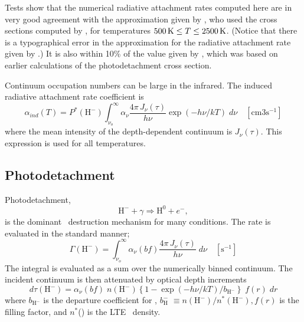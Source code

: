 Tests show that the numerical radiative attachment rates computed here
are in very good agreement with the approximation given by \citet{Hutchings1976},
who used the cross sections computed by \citet{Doughty1966}, for
temperatures $500 {\rm\thinspace K} \le T  \le 2500 {\rm\thinspace K}$.  (Notice that there is a typographical error
in the approximation for the radiative attachment rate given by
\citet{Palla1983}.)  It is also within 10\% of the value given
by \citet{Dalgarno1963}, which was based on earlier calculations
of the photodetachment cross section.

Continuum occupation numbers can be large in the infrared.  The induced
radiative attachment rate coefficient is
\begin{equation}
{\alpha _{ind}}(T) = {P^*}({{\mathrm{H}}^ - })\int_{{\nu _o}}^\infty  {{\alpha
_\nu }\frac{{4\pi \,{J_\nu }(\tau )}}{{h\nu }}} \exp \left( { - h\nu /kT}
\right)\;d\nu \quad [\mathrm{cm}3 \mathrm{s}^{-1}]
\end{equation}
where the mean intensity of the depth-dependent continuum is $J_{\nu}(\tau)$.  This
expression is used for all temperatures.

\subsection{Photodetachment}

Photodetachment,
\begin{equation}
{{\mathrm{H}}^ - } + \gamma  \Rightarrow {{\mathrm{H}}^{\mathrm{0}}} + {e^ - },
\end{equation}
is the dominant \hminus\ destruction mechanism for many conditions.  The rate
is evaluated in the standard manner;
\begin{equation}
\Gamma \left( {{{\mathrm{H}}^ - }} \right) = \int_{{\nu _o}}^\infty  {{\alpha
_\nu }\left( {bf} \right)\frac{{4\pi \,{J_\nu }(\tau )}}{{h\nu }}} \;d\nu
\quad [\mathrm{s}^{-1}]
\end{equation}
The integral is evaluated as a sum over the numerically binned continuum.
The incident continuum is then attenuated by optical depth increments
\begin{equation}
d\tau ({{\mathrm{H}}^ - }) = {\alpha _\nu }(bf)\;n({{\mathrm{H}}^ - })\left\{
{1 - \exp \left( { - h\nu /kT} \right)/{b_{{{\mathrm{H}}^ - }}}}
\right\}\;f(r)\;dr
\end{equation}
where ${b_{\mathrm{H}^ - }}$
 is the departure coefficient for \hminus, ${b_{\mathrm{H}}^{ - }}$
$\equiv  n(\mathrm{H}^-)/n^*(\mathrm{H}^-), f(r)$ is the filling factor, and
$n^*$(\hminus) is the LTE \hminus\ density.

